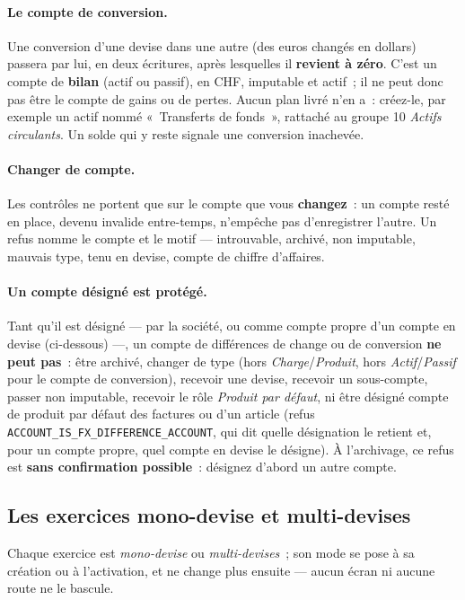 \documentclass[a4paper,11pt,oneside]{article}
\begin{document}
\paragraph{Le compte de conversion.} Une conversion d'une devise dans une autre (des euros changés en dollars) passera par lui, en deux écritures, après lesquelles il \textbf{revient à zéro}. C'est un compte de \textbf{bilan} (actif ou passif), en CHF, imputable et actif~; il ne peut donc pas être le compte de gains ou de pertes. Aucun plan livré n'en a~: créez-le, par exemple un actif nommé «~Transferts de fonds~», rattaché au groupe 10 \emph{Actifs circulants}. Un solde qui y reste signale une conversion inachevée.

\paragraph{Changer de compte.} Les contrôles ne portent que sur le compte que vous \textbf{changez}~: un compte resté en place, devenu invalide entre-temps, n'empêche pas d'enregistrer l'autre. Un refus nomme le compte et le motif --- introuvable, archivé, non imputable, mauvais type, tenu en devise, compte de chiffre d'affaires.

\paragraph{Un compte désigné est protégé.} Tant qu'il est désigné --- par la société, ou comme compte propre d'un compte en devise (ci-dessous) ---, un compte de différences de change ou de conversion \textbf{ne peut pas}~: être archivé, changer de type (hors \emph{Charge}/\emph{Produit}, hors \emph{Actif}/\emph{Passif} pour le compte de conversion), recevoir une devise, recevoir un sous-compte, passer non imputable, recevoir le rôle \emph{Produit par défaut}, ni être désigné compte de produit par défaut des factures ou d'un article (refus \texttt{ACCOUNT\_\allowbreak IS\_\allowbreak FX\_\allowbreak DIFFERENCE\_\allowbreak ACCOUNT}, qui dit quelle désignation le retient et, pour un compte propre, quel compte en devise le désigne). À l'archivage, ce refus est \textbf{sans confirmation possible}~: désignez d'abord un autre compte.

\subsection{Les exercices mono-devise et multi-devises}\label{sec:multi-devises-exercices}

Chaque exercice est \emph{mono-devise} ou \emph{multi-devises}~; son mode se pose à sa création ou à l'activation, et ne change plus ensuite --- aucun écran ni aucune route ne le bascule.
\end{document}
